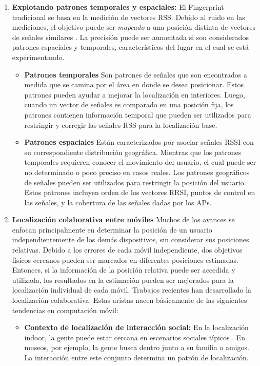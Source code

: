 \begin{enumerate}
\item \textbf{Explotando patrones temporales y espaciales:} El Fingerprint tradicional se basa en la medición de vectores RSS. Debido al ruido en las mediciones, el objetivo puede ser \textit{mapeado} a una posición distinta de vectores de señales similares \citep{6681592}. La precisión puede ser aumentada si son considerados patrones espaciales y temporales, característicos del lugar en el cual se está experimentando.

\begin{itemize}
\item \textbf{Patrones temporales} Son patrones de señales que son encontrados a medida que se camina por el área en donde se desea posicionar. Estos patrones pueden ayudar a mejorar la localización en interiores. Luego, cuando un vector de señales es comparado en una posición fija, los patrones contienen información temporal que pueden ser utilizados para restringir y corregir las señales RSS para la localización base.

\item \textbf{Patrones espaciales} Están caracterizados por asociar señales RSSI con su correspondiente distribución geográfica. Mientras que los patrones temporales requieren conocer el movimiento del usuario, el cual puede ser no determinado o poco preciso en casos reales. Los patrones geográficos de señales pueden ser utilizados para restringir la posición del usuario. Estos patrones incluyen orden de los vectores RRSI, puntos de control en las señales, y la cobertura de las señales dadas por los APs.

\end{itemize}

\item \textbf{Localización colaborativa entre móviles} Muchos de los avances se enfocan principalmente en determinar la posición de un usuario independientemente de los demás dispositivos, sin considerar sus posiciones relativas. Debido a los errores de cada móvil independiente, dos objetivos físicos cercanos pueden ser marcados en diferentes posiciones estimadas. Entonces, si la información de la posición relativa puede ser accedida y utilizada, los resultados en la estimación pueden ser mejorados para la localización individual de cada móvil. Trabajos recientes han desarrollado la localización colaborativa. Estas aristas nacen básicamente de las siguientes tendencias en computación móvil:

\begin{itemize}
\item \textbf{Contexto de localización de interacción social:} En la localización indoor, la gente puede estar cercana en escenarios sociales típicos \citep{Chan2006}. En museos, por ejemplo, la gente busca dentro junto a su familia o amigos. La interacción entre este conjunto determina un patrón de localización.


\end{itemize}
\end{enumerate}
